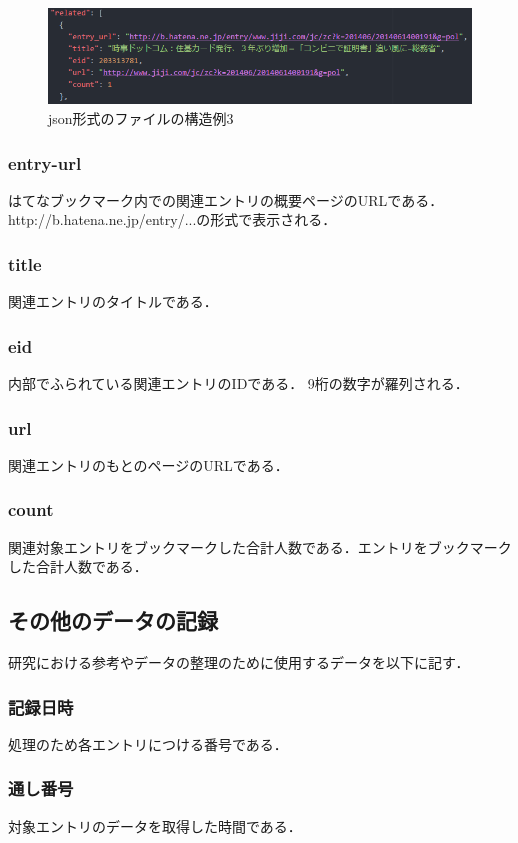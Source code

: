 \begin{figure}[htb]
\centering
\includegraphics[width=13cm]{json3.PNG}
\caption{json形式のファイルの構造例3}\label{json2}
\end{figure}

\subsubsection{entry-url}
はてなブックマーク内での関連エントリの概要ページのURLである．
http://b.hatena.ne.jp/entry/...の形式で表示される．
\subsubsection{title}
関連エントリのタイトルである．
\subsubsection{eid}
内部でふられている関連エントリのIDである．
9桁の数字が羅列される．
\subsubsection{url}
関連エントリのもとのページのURLである．
\subsubsection{count}
関連対象エントリをブックマークした合計人数である．エントリをブックマークした合計人数である．

\newpage

\subsection{その他のデータの記録}
研究における参考やデータの整理のために使用するデータを以下に記す．

\subsubsection{記録日時}
処理のため各エントリにつける番号である．
\subsubsection{通し番号}
対象エントリのデータを取得した時間である．
